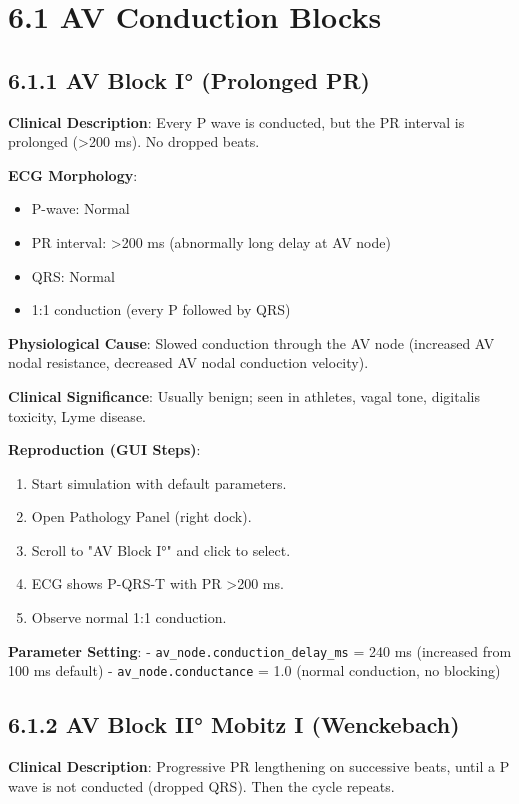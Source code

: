 \documentclass[12pt,oneside,a4paper]{book}
\newcommand{\code}[1]{\texttt{#1}}
\begin{document}
\section{6.1 AV Conduction Blocks}

\subsection{6.1.1 AV Block I° (Prolonged PR)}

\textbf{Clinical Description}:
Every P wave is conducted, but the PR interval is prolonged (\textgreater 200 ms). No dropped beats.

\textbf{ECG Morphology}:
\begin{itemize}
  \item P-wave: Normal
  \item PR interval: \textgreater 200 ms (abnormally long delay at AV node)
  \item QRS: Normal
  \item 1:1 conduction (every P followed by QRS)
\end{itemize}

\textbf{Physiological Cause}:
Slowed conduction through the AV node (increased AV nodal resistance, decreased AV nodal conduction velocity).

\textbf{Clinical Significance}:
Usually benign; seen in athletes, vagal tone, digitalis toxicity, Lyme disease.

\textbf{Reproduction (GUI Steps)}:
\begin{enumerate}
  \item Start simulation with default parameters.
  \item Open Pathology Panel (right dock).
  \item Scroll to "AV Block I°" and click to select.
  \item ECG shows P-QRS-T with PR \textgreater 200 ms.
  \item Observe normal 1:1 conduction.
\end{enumerate}

\textbf{Parameter Setting}:
- \code{av\_node.conduction\_delay\_ms} = 240 ms (increased from 100 ms default)
- \code{av\_node.conductance} = 1.0 (normal conduction, no blocking)

\subsection{6.1.2 AV Block II° Mobitz I (Wenckebach)}

\textbf{Clinical Description}:
Progressive PR lengthening on successive beats, until a P wave is not conducted (dropped QRS). Then the cycle repeats.
\end{document}
